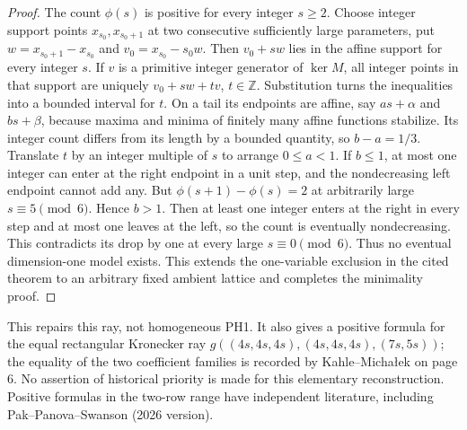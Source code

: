 \begin{proof}
The count $\phi(s)$ is positive for every integer $s\ge2$. Choose
integer support points $x_{s_0},x_{s_0+1}$ at two consecutive sufficiently
large parameters, put $w=x_{s_0+1}-x_{s_0}$ and $v_0=x_{s_0}-s_0w$.
Then $v_0+sw$ lies in the affine support for every integer $s$.
If $v$ is a primitive integer generator of $\ker M$, all integer
points in that support are uniquely $v_0+sw+tv$, $t\in\mathbb Z$.
Substitution turns the inequalities into a bounded interval for $t$.
On a tail its endpoints are affine, say $as+\alpha$ and $bs+\beta$,
because maxima and minima of finitely many affine functions stabilize.
Its integer count differs from its length by a bounded quantity,
so $b-a=1/3$. Translate $t$ by an integer multiple of $s$ to arrange
$0\le a<1$.
If $b\le1$, at most one integer can enter at the right endpoint in a
unit step, and the nondecreasing left endpoint cannot add any.
But $\phi(s+1)-\phi(s)=2$ at arbitrarily large $s\equiv5\pmod6$.
Hence $b>1$. Then at least one integer enters at the right in every
step and at most one leaves at the left, so the count is eventually
nondecreasing. This contradicts its drop by one at every large
$s\equiv0\pmod6$. Thus no eventual dimension-one model exists.
This extends the one-variable exclusion in the cited theorem to an
arbitrary fixed ambient lattice and completes the minimality proof.
\end{proof}

This repairs this ray, not homogeneous PH1. It also gives a positive
formula for the equal rectangular Kronecker ray
$g((4s,4s,4s),(4s,4s,4s),(7s,5s))$; the equality of the two coefficient
families is recorded by Kahle--Micha\l ek on page 6.
No assertion of historical priority is made for this elementary
reconstruction. Positive formulas in the two-row range have independent
literature, including Pak--Panova--Swanson (2026 version).

